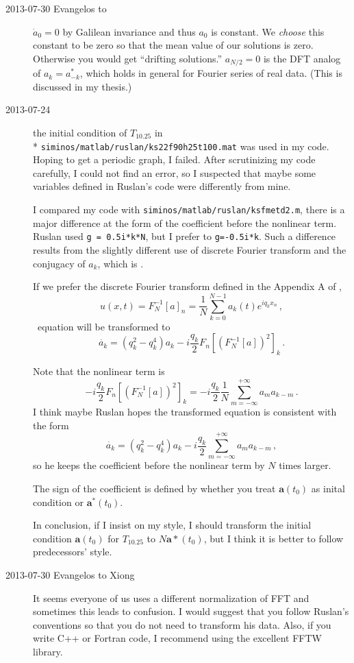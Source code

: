 \begin{description}
\item[2013-07-30 Evangelos to \XD] $\dot{a}_0=0$ by Galilean invariance
    and thus $a_0$ is constant. We \emph{choose} this constant to be
    zero so that the mean value of our solutions is zero. Otherwise you
    would get ``drifting solutions.'' $a_{N/2}=0$ is the DFT analog of
    $a_k=a^*_{-k}$, which holds in general for Fourier series of real
    data. (This is discussed in my thesis.)

\item[2013-07-24  \XD] the initial condition of $T_{10.25}$ in
\\*
\texttt{siminos/matlab/ruslan/ks22f90h25t100.mat}
was used in my code. Hoping to get a
periodic graph, I failed. After scrutinizing my code carefully,
I could not find an error, so I suspected that maybe some variables
defined in Ruslan's code were differently
from mine.

I compared my code with \texttt{siminos/matlab/ruslan/ksfmetd2.m},
there is a major difference at the form of the coefficient before the nonlinear term.
Ruslan used \texttt{g = 0.5i*k*N}, but I prefer to \texttt{g=-0.5i*k}.
Such a difference results from the slightly different use of discrete Fourier transform
and the conjugacy of $a_k$, which is .

If we prefer the discrete Fourier transform defined in the Appendix A of
,
\[
 u(x,t)=F_N^{-1}[a]_n=\frac{1}{N}\sum_{k=0}^{N-1} a_{k}(t)e^{iq_{k}x_{n}}
\,,
\]
\KS\ equation will be transformed to
\[
 \dot{a_k}=(q_{k}^2-q_k^4)a_k-i\frac{q_k}{2}F_{n}[(F_N^{-1}[a])^2]_k
\,.
\]

Note that the nonlinear term is
\[
-i\frac{q_k}{2}F_{n}[(F_N^{-1}[a])^2]_k=-i\frac{q_k}{2}\frac{1}{N}\sum_{m=-\infty}^{+\infty}a_{m}a_{k-m}
\,.
\]
I think maybe Ruslan hopes the transformed equation is consistent with the form
\[
 \dot{a_k}=(q_{k}^2-q_k^4)a_k-i\frac{q_k}{2}\sum_{m=-\infty}^{+\infty}a_{m}a_{k-m}
\,,
\]
so he keeps the coefficient before the nonlinear term by $N$ times larger.

The sign of the coefficient is defined by whether you treat $\mathbf{a}(t_0)$ as inital condition or
$\mathbf{a}^{*}(t_0)$.


In conclusion, if I insist on my style, I should transform the initial condition $\mathbf{a}(t_0)$
for $T_{10.25}$  to $N\mathbf{a}*(t_0)$, but I think it is better to follow predecessors' style.

\item[2013-07-30 Evangelos to Xiong]
It seems everyone of us uses a different normalization of FFT and sometimes this leads to
confusion. I would suggest that you follow Ruslan's conventions so that you do not need to transform
his data. Also, if you write C++ or Fortran code, I recommend using the excellent FFTW library.




\end{description}

